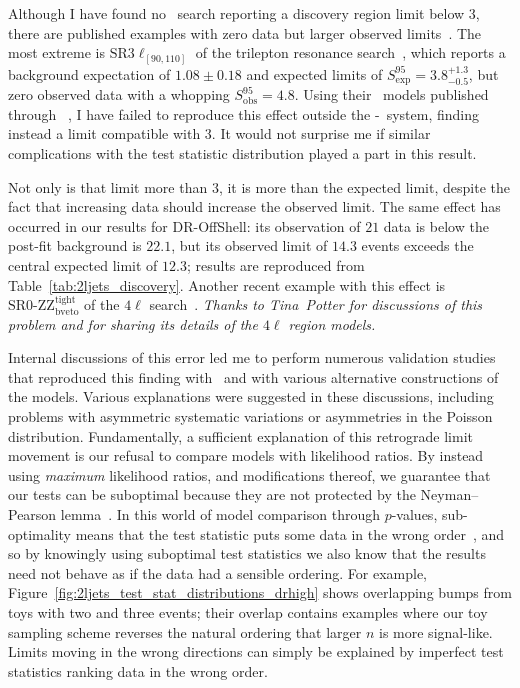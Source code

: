 Although I have found no \atlas\ search reporting a discovery region limit
below $3$, there are published examples with zero data but larger observed
limits~\cite{SUSY-2018-36, atlas_susy_strong_0l}.
The most extreme is $\mathrm{SR}3\ell_{[90,110]}$
of the trilepton resonance search~\cite{SUSY-2018-36}, which reports a
background expectation of $1.08 \pm 0.18$ and expected limits of
$S_{\mathrm{exp}}^{95} = 3.8^{+1.3}_{-0.5}$, but zero observed data with a
whopping $S_{\mathrm{obs}}^{95} = 4.8$.
Using their \pyhf\ models published through \hepdata~\cite{hepdata.99806},
I have failed to reproduce this effect outside the \histfitter-\roofit\ system,
finding instead a limit compatible with $3$.
It would not surprise me if similar complications with the test statistic
distribution played a part in this result.

Not only is that limit more than $3$, it is more than the expected limit,
despite the fact that increasing data should increase the observed limit.
The same effect has occurred in our results for DR-OffShell: its observation
of $21$ data is below the post-fit background is $22.1$, but its observed limit
of $14.3$ events exceeds the central expected limit of $12.3$;
results are reproduced from Table~\ref{tab:2ljets_discovery}.
Another recent example with this effect is
$\mathrm{SR}0\textrm{-}\mathrm{ZZ^{tight}_{bveto}}$ of the $4\ell$
search~\cite{SUSY-2018-02}.
\emph{Thanks to Tina~Potter for discussions of this problem and for sharing
its details of the $4\ell$ region models.}

Internal discussions of this error led me to perform numerous validation
studies that reproduced this finding with \pyhf\ and with various alternative
constructions of the models.
Various explanations were suggested in these discussions, including problems
with asymmetric systematic variations or asymmetries in the Poisson
distribution.
Fundamentally, a sufficient explanation of this retrograde limit movement
is our refusal to compare models with likelihood ratios.
By instead using \emph{maximum} likelihood ratios, and modifications thereof,
we guarantee that our tests can be suboptimal because they are not protected by
the Neyman–Pearson lemma~\cite{neymanpearson1933lemma}.
In this world of model comparison through $p$-values, sub-optimality means
that the test statistic puts some data in the wrong
order~\cite{cousins2008evaluation},
and so by knowingly using suboptimal test statistics we also know that the
results need not behave as if the data had a sensible ordering.
For example, Figure~\ref{fig:2ljets_test_stat_distributions_drhigh} shows
overlapping bumps from toys with two and three events; their overlap
contains examples where our toy sampling scheme reverses the natural
ordering that larger $n$ is more signal-like.
Limits moving in the wrong directions can simply be explained by imperfect
test statistics ranking data in the wrong order.

